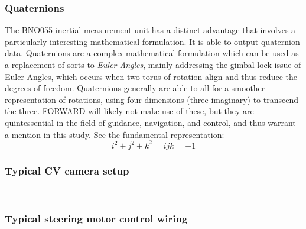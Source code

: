 \subsubsection{Quaternions}
\noindent The BNO055 inertial measurement unit has a distinct advantage that involves a particularly interesting mathematical formulation. It is able to output quaternion data. Quaternions are a complex mathematical formulation which can be used as a replacement of sorts to \textit{Euler Angles}, mainly addressing the gimbal lock issue of Euler Angles, which occurs when two torus of rotation align and thus reduce the degrees-of-freedom. Quaternions generally are able to all for a smoother representation of rotations, using four dimensions (three imaginary) to transcend the three. \cite{quat} FORWARD will likely not make use of these, but they are quintessential in the field of guidance, navigation, and control, and thus warrant a mention in this study. See the fundamental representation:\\
$$i^2+j^2+k^2=ijk=-1$$

\subsubsection{Typical CV camera setup}\



\subsubsection{Typical steering motor control wiring}

